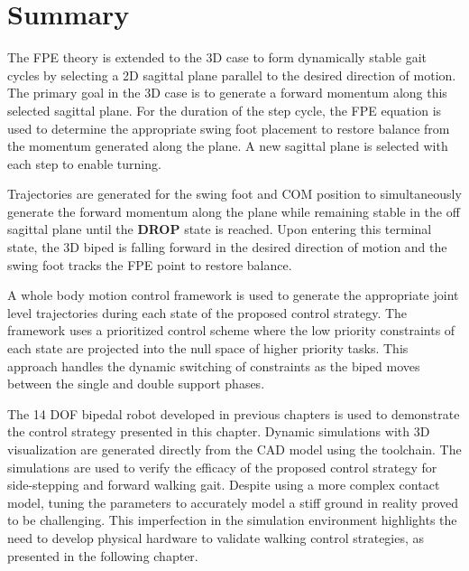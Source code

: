 \section{Summary} %
\label{sec:simulations_summary}
The FPE theory is extended to the 3D case to form dynamically stable gait cycles by selecting a 2D sagittal plane parallel to the desired direction of motion. The primary goal in the 3D case is to generate a forward momentum along this selected sagittal plane. For the duration of the step cycle, the FPE equation is used to determine the appropriate swing foot placement to restore balance from the momentum generated along the plane. A new sagittal plane is selected with each step to enable turning. 

Trajectories are generated for the swing foot and COM position to simultaneously generate the forward momentum along the plane while remaining stable in the off sagittal plane until the \textbf{DROP} state is reached. Upon entering this terminal state, the 3D biped is falling forward in the desired direction of motion and the swing foot tracks the FPE point to restore balance. 

A whole body motion control framework is used to generate the appropriate joint level trajectories during each state of the proposed control strategy. The framework uses a prioritized control scheme where the low priority constraints of each state are projected into the null space of higher priority tasks. This approach handles the dynamic switching of constraints as the biped moves between the single and double support phases. 

The 14 DOF bipedal robot developed in previous chapters is used to demonstrate the control strategy presented in this chapter. Dynamic simulations with 3D visualization are generated directly from the CAD model using the toolchain. The simulations are used to verify the efficacy of the proposed control strategy for side-stepping and forward walking gait. Despite using a more complex contact model, tuning the parameters to accurately model a stiff ground in reality proved to be challenging. This imperfection in the simulation environment highlights the need to develop physical hardware to validate walking control strategies, as presented in the following chapter.

